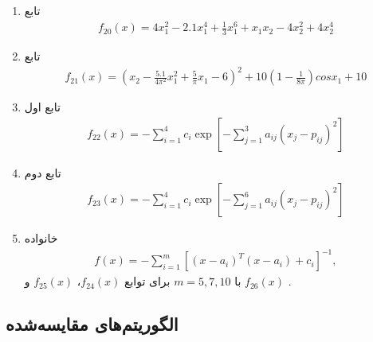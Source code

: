 \documentclass[12pt,a4paper]{article}
\theoremstyle{definition}
\theoremstyle{theorem}
\theoremstyle{definition}
\begin{document}
\begin{enumerate}
		
		\item
		  تابع
		\begin{align*}
		f_{20} (x) = 4x_1^2 - 2.1x_1^4 + \frac{1}{3}x_1^6 + x_1x_2 - 4x_2^2 + 4x_2^4
		\end{align*}
		
		
		\item
		  تابع
		\begin{align*}
		f_{21} (x)  = \left( x_2 - \frac{5.1}{4\pi^2}x_1^2 + \frac{5}{\pi}x_1 - 6 \right)^2 + 10 \left( 1- \frac{1}{8\pi}\right)cos x_1 + 10
		\end{align*}
		
		
		\item
		  تابع اول
		\begin{align*}
		f_{22} (x) = -\sum_{i=1}^{4} c_i \exp\left[ -\sum_{j=1}^3 a_{ij}(x_j - p_{ij})^2\right]
		\end{align*}
		
		
		\item
		  تابع دوم
		\begin{align*}
		f_{23} (x)  = -\sum_{i=1}^{4} c_i \exp\left[ -\sum_{j=1}^6 a_{ij}(x_j - p_{ij})^2\right]
		\end{align*}
		
		
		\item
		  خانواده
		\begin{align*}
		f(x)  = - \sum_{i=1}^m{[(x-a_i)^T(x-a_i) + c_i]^{-1}},
		\end{align*}
		با 
		$m=5,7 , 10$
		برای توابع
		$f_{24}(x)$،
		$f_{25}(x)$
		و 
		$f_{26}(x)$ . 

\end{enumerate}

\subsection{‌الگوریتم‌های مقایسه‌شده}
\end{document}
